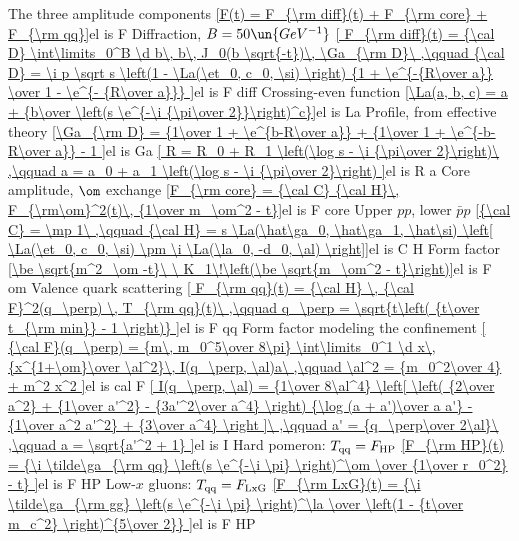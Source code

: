 The three amplitude components
\eqref{F(t) = F_{\rm diff}(t) + F_{\rm core} + F_{\rm qq}}{el is F}
Diffraction, $B = 50\un{GeV^{-1}}$
\eqref{
	F_{\rm diff}(t) = {\cal D} \int\limits_0^B \d b\, b\, J_0(b \sqrt{-t})\, \Ga_{\rm D}\ ,\qquad
	{\cal D} = \i p \sqrt s \left(1 - \La(\et_0, c_0, \si) \right) {1 + \e^{-{R\over a}} \over 1 - \e^{- {R\over a}}}
}{el is F diff}
Crossing-even function
\eqref{\La(a, b, c) = a + {b\over \left(s \e^{-\i {\pi\over 2}}\right)^c}}{el is La}
Profile, from effective theory
\eqref{\Ga_{\rm D} =
	{1\over 1 + \e^{b-R\over a}}
	+ {1\over 1 + \e^{-b-R\over a}}
	- 1
}{el is Ga}
\eqref{
	R = R_0 + R_1 \left(\log s - \i {\pi\over 2}\right)\ ,\qquad
	a = a_0 + a_1 \left(\log s - \i {\pi\over 2}\right)
}{el is R a}
Core amplitude, $\om$ exchange
\eqref{F_{\rm core} = {\cal C} {\cal H}\, F_{\rm\om}^2(t)\, {1\over m_\om^2 - t}}{el is F core}
Upper $pp$, lower $\bar pp$
\eqref{{\cal C} = \mp 1\ ,\qquad {\cal H} = s \La(\hat\ga_0, \hat\ga_1, \hat\si) \left[ \La(\et_0, c_0, \si) \pm \i \La(\la_0, -d_0, \al) \right]}{el is C H}
Form factor
\eqref{\be \sqrt{m^2_\om -t}\ \ K_1\!\left(\be \sqrt{m_\om^2 - t}\right)}{el is F om}
Valence quark scattering
\eqref{
	F_{\rm qq}(t) = {\cal H} \, {\cal F}^2(q_\perp) \, T_{\rm qq}(t)\ ,\qquad
	q_\perp = \sqrt{t\left( {t\over t_{\rm min}} - 1 \right)}
}{el is F qq}
Form factor modeling the confinement
\eqref{
	{\cal F}(q_\perp) = {m\, m_0^5\over 8\pi} \int\limits_0^1 \d x\, {x^{1+\om}\over \al^2}\, I(q_\perp, \al)a\ ,\qquad
	\al^2 = {m_0^2\over 4} + m^2 x^2
}{el is cal F}
\eqref{
	I(q_\perp, \al) = {1\over 8\al^4} \left[
		\left( {2\over a^2} + {1\over a'^2} - {3a'^2\over a^4} \right) {\log (a + a')\over a a'}
		- {1\over a^2 a'^2}
		+ {3\over a^4}
	\right ]\ ,\qquad
	a' = {q_\perp\over 2\al}\ ,\qquad
	a = \sqrt{a'^2 + 1}
}{el is I}
Hard pomeron: $T_{\rm qq} = F_{\rm HP}$
\eqref{F_{\rm HP}(t) = {\i \tilde\ga_{\rm qq} \left(s \e^{-\i \pi} \right)^\om \over {1\over r_0^2} - t} }{el is F HP}
Low-$x$ gluons: $T_{\rm qq} = F_{\rm LxG}$
\eqref{F_{\rm LxG}(t) = {\i \tilde\ga_{\rm gg} \left(s \e^{-\i \pi} \right)^\la \over \left(1 - {t\over m_c^2} \right)^{5\over 2}} }{el is F HP}


\def\OutlineLabel{The model of Petrov et al.}

